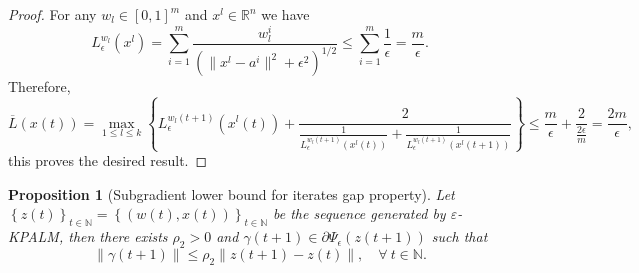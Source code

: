 \documentclass[11pt]{article}
\numberwithin{equation}{section}
\newtheorem{proposition}{Proposition}[section]
\begin{document}
\begin{proof}
For any $w_l \in \left[ 0,1 \right]^m$ and $x^l \in \mathbb{R}^n$ we have
\begin{equation*}
	L_{\epsilon}^{w_l}(x^l) = \sum\limits_{i=1}^m \frac{w^i_l}{\left( \|x^l - a^i\|^2 + {\epsilon}^2 \right)^{1/2}} \leq \sum\limits_{i=1}^m \frac{1}{\epsilon} = \frac{m}{\epsilon}.
\end{equation*}
Therefore,
\begin{equation*}
	\overline{L}(x(t)) = \max\limits_{1 \leq l \leq k} \left\lbrace L_{\epsilon}^{w_l(t+1)}(x^l(t)) + \frac{2}{\frac{1}{L_{\epsilon}^{w_l(t+1)}(x^l(t))} + \frac{1}{L_{\epsilon}^{w_l(t+1)}(x^l(t+1))}} \right\rbrace \leq \frac{m}{\epsilon} + \frac{2}{\frac{2\epsilon}{m}} = \frac{2m}{\epsilon} ,
\end{equation*}
this proves the desired result.
\end{proof}

\begin{proposition}[Subgradient lower bound for iterates gap property]
Let $\left\lbrace z(t) \right\rbrace_{t \in \mathbb{N}} = \left\lbrace (w(t) , x(t)) \right\rbrace_{t \in \mathbb{N}}$ be the sequence generated by $\varepsilon$-KPALM, then there exists $\rho_2 > 0$ and $\gamma(t+1) \in \partial \Psi_{\epsilon}(z(t+1))$ such that 
\begin{equation*}
	\| \gamma(t+1)\| \leq \rho_2 \|z(t+1) - z(t)\|, \quad \forall \: t \in \mathbb{N} .
\end{equation*}
\end{proposition}
\end{document}
